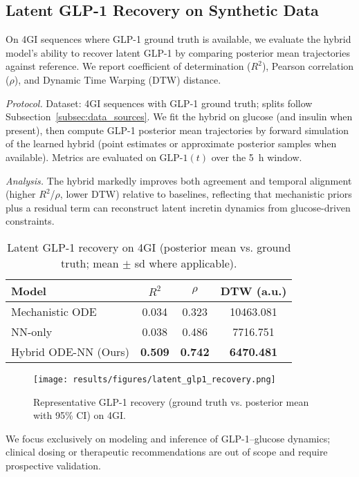\documentclass[9pt,shortpaper,twoside,web]{ieeecolor}
\begin{document}
\subsection{Latent GLP-1 Recovery on Synthetic Data}
\label{subsec:latent_recovery}
On 4GI sequences where GLP-1 ground truth is available, we evaluate the hybrid model's ability to recover latent GLP-1 by comparing posterior mean trajectories against reference. We report coefficient of determination ($R^2$), Pearson correlation ($\rho$), and Dynamic Time Warping (DTW) distance.

\noindent\textit{Protocol.} Dataset: 4GI sequences with GLP-1 ground truth; splits follow Subsection~\ref{subsec:data_sources}. We fit the hybrid on glucose (and insulin when present), then compute GLP-1 posterior mean trajectories by forward simulation of the learned hybrid (point estimates or approximate posterior samples when available). Metrics are evaluated on $\text{GLP-1}(t)$ over the 5~h window.

\noindent\textit{Analysis.} The hybrid markedly improves both agreement and temporal alignment (higher $R^2$/$\rho$, lower DTW) relative to baselines, reflecting that mechanistic priors plus a residual term can reconstruct latent incretin dynamics from glucose-driven constraints.

\begin{table}[h]
\centering
\caption{Latent GLP-1 recovery on 4GI (posterior mean vs. ground truth; mean $\pm$ sd where applicable).}
\label{tab:latent_glp1}
\begin{tabular}{lccc}
\toprule
Model & $R^2$ & $\rho$ & DTW (a.u.) \\
\midrule
Mechanistic ODE & 0.034 & 0.323 & 10463.081 \\
NN-only & 0.038 & 0.486 & 7716.751 \\
Hybrid ODE-NN (Ours) & \textbf{0.509} & \textbf{0.742} & \textbf{6470.481} \\
\bottomrule
\end{tabular}
\end{table}

\begin{figure}[h]
\centering
\texttt{[image: results/figures/latent\_glp1\_recovery.png]}
\caption{Representative GLP-1 recovery (ground truth vs. posterior mean with 95\% CI) on 4GI.}
\label{fig:latent_glp1_recovery}
\end{figure}



We focus exclusively on modeling and inference of GLP-1–glucose dynamics; clinical dosing or therapeutic recommendations are out of scope and require prospective validation.
\end{document}
